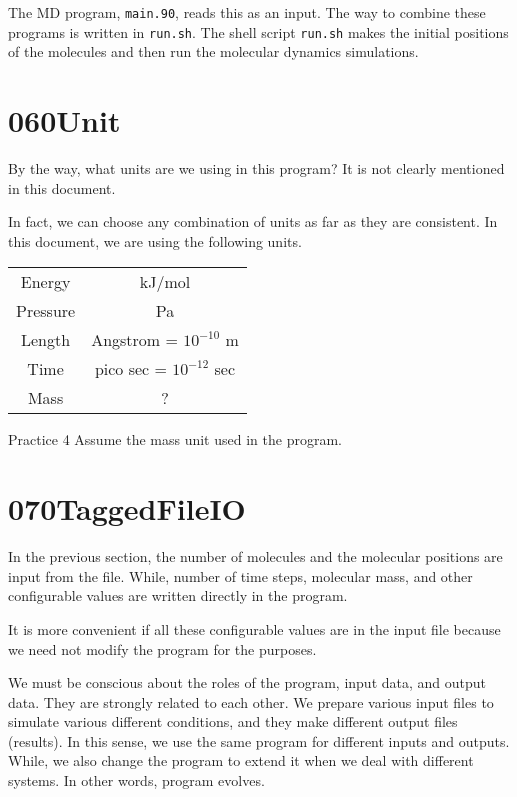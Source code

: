 \documentclass[a4,10pt]{article}
\begin{document}
The MD program, {\tt main.90}, reads this as an input.  The way to combine these programs is written in {\tt run.sh}.
The shell script {\tt run.sh} makes the initial positions of the molecules and then run the molecular dynamics simulations.


\section{060Unit}

By the way, what units are we using in this program?  It is not clearly mentioned in this document.

In fact, we can choose any combination of units as far as they are consistent.  In this document, we are using the following units.
\begin{center}
\begin{tabular}{cc}
\hline
Energy&kJ/mol\\
Pressure&Pa\\
Length&Angstrom = $10^{-10}$ m\\
Time&pico sec = $10^{-12}$ sec\\
Mass&?\\
 \hline
 \end{tabular}
\end{center}
\begin{itembox}[l]{Practice 4}
Assume the mass unit used in the program.
\end{itembox}
\section{070TaggedFileIO}
In the previous section, the number of molecules and the molecular positions are input from the file.  While, number of time steps, molecular mass, and other configurable values are written directly in the program.

It is more convenient if all these configurable values are in the input file because we need not modify the program for the purposes.

We must be conscious about the roles of the program, input data, and output data.  They are strongly related to each other.  We prepare various input files to simulate various different conditions, and they make different output files (results).  In this sense, we use the same program for different inputs and outputs.  While, we also change the program to extend it when we deal with different systems.  In other words, program evolves.
\end{document}
